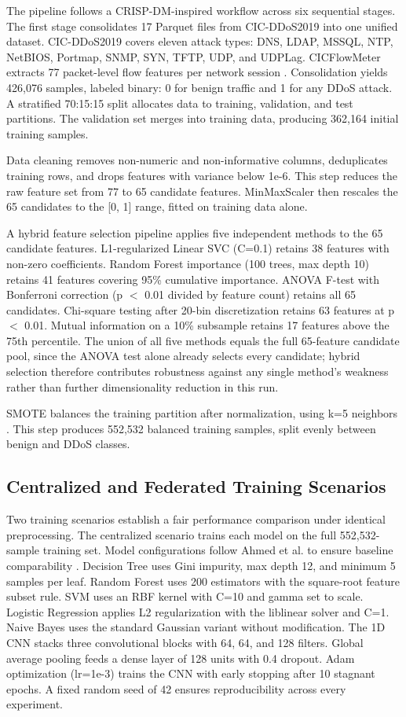 \documentclass[conference, a4paper]{IEEEtran}
\begin{document}
The pipeline follows a CRISP-DM-inspired workflow across six sequential stages. The first stage consolidates 17 Parquet files from CIC-DDoS2019 into one unified dataset. CIC-DDoS2019 covers eleven attack types: DNS, LDAP, MSSQL, NTP, NetBIOS, Portmap, SNMP, SYN, TFTP, UDP, and UDPLag. CICFlowMeter extracts 77 packet-level flow features per network session \cite{b3}. Consolidation yields 426,076 samples, labeled binary: 0 for benign traffic and 1 for any DDoS attack. A stratified 70:15:15 split allocates data to training, validation, and test partitions. The validation set merges into training data, producing 362,164 initial training samples.

Data cleaning removes non-numeric and non-informative columns, deduplicates training rows, and drops features with variance below 1e-6. This step reduces the raw feature set from 77 to 65 candidate features. MinMaxScaler then rescales the 65 candidates to the [0, 1] range, fitted on training data alone.

A hybrid feature selection pipeline applies five independent methods to the 65 candidate features. L1-regularized Linear SVC (C=0.1) retains 38 features with non-zero coefficients. Random Forest importance (100 trees, max depth 10) retains 41 features covering 95\% cumulative importance. ANOVA F-test with Bonferroni correction (p $<$ 0.01 divided by feature count) retains all 65 candidates. Chi-square testing after 20-bin discretization retains 63 features at p $<$ 0.01. Mutual information on a 10\% subsample retains 17 features above the 75th percentile. The union of all five methods equals the full 65-feature candidate pool, since the ANOVA test alone already selects every candidate; hybrid selection therefore contributes robustness against any single method's weakness rather than further dimensionality reduction in this run.

SMOTE balances the training partition after normalization, using k=5 neighbors \cite{b11}. This step produces 552,532 balanced training samples, split evenly between benign and DDoS classes.

\subsection{Centralized and Federated Training Scenarios}

Two training scenarios establish a fair performance comparison under identical preprocessing. The centralized scenario trains each model on the full 552,532-sample training set. Model configurations follow Ahmed et al. to ensure baseline comparability \cite{b10}. Decision Tree uses Gini impurity, max depth 12, and minimum 5 samples per leaf. Random Forest uses 200 estimators with the square-root feature subset rule. SVM uses an RBF kernel with C=10 and gamma set to scale. Logistic Regression applies L2 regularization with the liblinear solver and C=1. Naive Bayes uses the standard Gaussian variant without modification. The 1D CNN stacks three convolutional blocks with 64, 64, and 128 filters. Global average pooling feeds a dense layer of 128 units with 0.4 dropout. Adam optimization (lr=1e-3) trains the CNN with early stopping after 10 stagnant epochs. A fixed random seed of 42 ensures reproducibility across every experiment.
\end{document}
